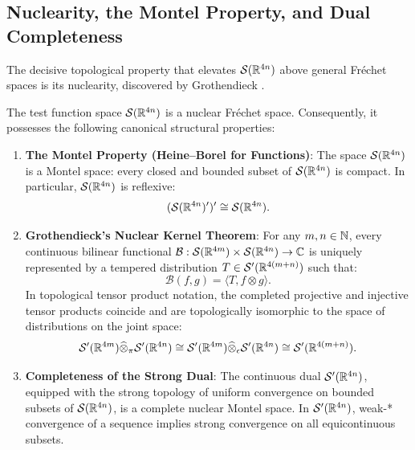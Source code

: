 \subsection{Nuclearity, the Montel Property, and Dual Completeness}
\label{subsec:nuclear_montel_properties}

The decisive topological property that elevates $\mathcal{S}(\mathbb{R}^{4n})$ above general Fr\'echet spaces is its nuclearity, discovered by Grothendieck \cite{Grothendieck1955}.

\begin{proposition}
\label{prop:nuclear_montel}
The test function space $\mathcal{S}(\mathbb{R}^{4n})$ is a nuclear Fr\'echet space. Consequently, it possesses the following canonical structural properties:
\begin{enumerate}[label=\textup{(\roman*)}]
    \item \textbf{The Montel Property (Heine--Borel for Functions)}: The space $\mathcal{S}(\mathbb{R}^{4n})$ is a Montel space: every closed and bounded subset of $\mathcal{S}(\mathbb{R}^{4n})$ is compact. In particular, $\mathcal{S}(\mathbb{R}^{4n})$ is reflexive:
    \begin{equation}
    (\mathcal{S}(\mathbb{R}^{4n})')' \cong \mathcal{S}(\mathbb{R}^{4n}).
    \end{equation}

    \item \textbf{Grothendieck's Nuclear Kernel Theorem}: For any $m, n \in \mathbb{N}$, every continuous bilinear functional $\mathcal{B} : \mathcal{S}(\mathbb{R}^{4m}) \times \mathcal{S}(\mathbb{R}^{4n}) \to \mathbb{C}$ is uniquely represented by a tempered distribution $T \in \mathcal{S}'(\mathbb{R}^{4(m+n)})$ such that:
    \begin{equation}
    \mathcal{B}(f, g) = \langle T, f \otimes g \rangle.
    \end{equation}
    In topological tensor product notation, the completed projective and injective tensor products coincide and are topologically isomorphic to the space of distributions on the joint space:
    \begin{equation}
    \mathcal{S}'(\mathbb{R}^{4m}) \widehat{\otimes}_\pi \mathcal{S}'(\mathbb{R}^{4n}) \cong \mathcal{S}'(\mathbb{R}^{4m}) \widehat{\otimes}_\epsilon \mathcal{S}'(\mathbb{R}^{4n}) \cong \mathcal{S}'(\mathbb{R}^{4(m+n)}).
    \end{equation}

    \item \textbf{Completeness of the Strong Dual}: The continuous dual $\mathcal{S}'(\mathbb{R}^{4n})$, equipped with the strong topology of uniform convergence on bounded subsets of $\mathcal{S}(\mathbb{R}^{4n})$, is a complete nuclear Montel space. In $\mathcal{S}'(\mathbb{R}^{4n})$, weak-* convergence of a sequence implies strong convergence on all equicontinuous subsets.
\end{enumerate}
\end{proposition}

